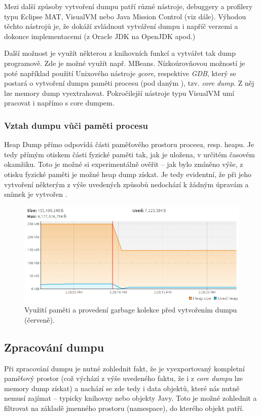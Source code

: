 Mezi další způsoby vytvoření dumpu patří různé nástroje, debuggery a profilery typu Eclipse MAT, VisualVM nebo Java Mission Control (viz dále). Výhodou těchto nástrojů je, že dokáží zvládnout vytváření dumpu i napříč verzemi a dokonce implementacemi (z Oracle JDK na OpenJDK apod.)

Další možnost je využít některou z knihovních funkcí a vytvářet tak dump programově. Zde je možné využít např. MBeans. Nízkoúrovňovou možností je poté například použití Unixového nástroje \textit{gcore}, respektive \textit{GDB}, který se postará o vytvoření dumpu paměti procesu (pod daným ), tzv. \textit{core dump}. Z něj lze memory dump vyextrahovat. Pokročilejší nástroje typu VisualVM umí pracovat i napřímo s core dumpem.

\subsubsection{Vztah dumpu vůči paměti procesu}
Heap Dump přímo odpovídá části paměťového prostoru procesu, resp. heapu. Je tedy přímým otiskem části fyzické paměti tak, jak je uložena, v určitém časovém okamžiku. Toto je možné si experimentálně ověřit -- jak bylo zmíněno výše, z otisku fyzické paměti je možné heap dump získat. Je tedy evidentní, že při jeho vytvoření některým z výše uvedených způsobů nedochází k žádným úpravám a snímek je vytvořen . 

\begin{figure}[h]
	\centering
	\includegraphics[scale=0.5]{obrazky/heapdump-performed.png}
	\caption{Využití paměti a provedení garbage kolekce před vytvořením dumpu (červeně).}
	\label{obr1}
\end{figure}

\subsection{Zpracování dumpu}
Při zpracování dumpu je nutné zohlednit fakt, že je vyexportovaný kompletní paměťový prostor (což výchází z výše uvedeného faktu, že i z \textit{core dumpu} lze memory dump získat) a nachází se zde tedy i data objektů, které nás nutně nemusí zajímat – typicky knihovny nebo objekty Javy. Toto je možné zohlednit a filtrovat na základě jmenného prostoru (namespace), do kterého objekt patří.

